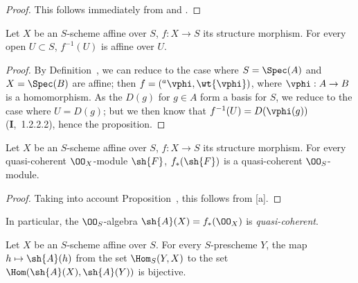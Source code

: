 \begin{proof}
\label{proof-2.1.2.4}
This follows immediately from  and .
\end{proof}

\begin{prop}[1.2.5]
\label{2.1.2.5}
Let $X$ be an $S$-scheme affine over $S$, $f:X\to S$ its structure morphism.
For every open $U\subset S$, $f^{-1}(U)$ is affine over $U$.
\end{prop}

\begin{proof}
\label{proof-2.1.2.5}
By Definition~, we can reduce to the case where $S=\Spec(A)$ and $X=\Spec(B)$ are affine; then $f=({}^a\vphi,\wt{\vphi})$, where $\vphi:A\to B$ is a homomorphism.
As the $D(g)$ for $g\in A$ form a basis for $S$, we reduce to the case where $U=D(g)$; but we then know that $f^{-1}(U)=D(\vphi(g))$ (\textbf{I},~1.2.2.2), hence the proposition.
\end{proof}

\begin{prop}[1.2.6]
\label{2.1.2.6}
Let $X$ be an $S$-scheme affine over $S$, $f:X\to S$ its structure morphism.
For every quasi-coherent $\OO_X$-module $\sh{F}$, $f_*(\sh{F})$ is a quasi-coherent $\OO_S$-module.
\end{prop}

\begin{proof}
\label{proof-2.1.2.6}
Taking into account Proposition~, this follows from [a].
\end{proof}

In particular, the $\OO_S$-algebra $\sh{A}(X)=f_*(\OO_X)$ is \emph{quasi-coherent}.

\begin{prop}[1.2.7]
\label{2.1.2.7}
Let $X$ be an $S$-scheme affine over $S$.
For every $S$-prescheme $Y$, the map $h\mapsto\sh{A}(h)$ from the set $\Hom_S(Y,X)$ to the set $\Hom(\sh{A}(X),\sh{A}(Y))$  is bijective.
\end{prop}

